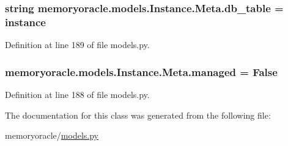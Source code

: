 \subsubsection[{db\+\_\+table}]{\setlength{\rightskip}{0pt plus 5cm}string memoryoracle.\+models.\+Instance.\+Meta.\+db\+\_\+table = \textquotesingle{}instance\textquotesingle{}\hspace{0.3cm}{\ttfamily [static]}}\label{classmemoryoracle_1_1models_1_1Instance_1_1Meta_a219ec0b854fe835781e6cfe1768c1660}


Definition at line 189 of file models.\+py.

\hypertarget{classmemoryoracle_1_1models_1_1Instance_1_1Meta_aa49b57f632dea2fadb768e9661b9bcaa}{}
\subsubsection[{managed}]{\setlength{\rightskip}{0pt plus 5cm}memoryoracle.\+models.\+Instance.\+Meta.\+managed = False\hspace{0.3cm}{\ttfamily [static]}}\label{classmemoryoracle_1_1models_1_1Instance_1_1Meta_aa49b57f632dea2fadb768e9661b9bcaa}


Definition at line 188 of file models.\+py.



The documentation for this class was generated from the following file\+:\begin{DoxyCompactItemize}
\item 
memoryoracle/\hyperlink{models_8py}{models.\+py}\end{DoxyCompactItemize}
